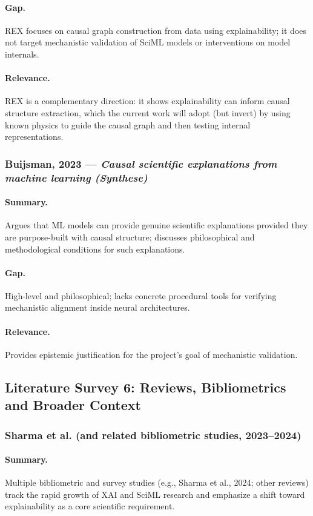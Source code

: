 \documentclass[12pt,singleside,a4paper]{article}
\begin{document}
\paragraph{Gap.}
REX focuses on causal graph construction from data using explainability; it does not target mechanistic validation of SciML models or interventions on model internals.  
\paragraph{Relevance.}
REX is a complementary direction: it shows explainability can inform causal structure extraction, which the current work will adopt (but invert) by using known physics to guide the causal graph and then testing internal representations. 

\subsubsection{Buijsman, 2023 — \textit{Causal scientific explanations from machine learning (Synthese)}}
\paragraph{Summary.}
Argues that ML models can provide genuine scientific explanations provided they are purpose-built with causal structure; discusses philosophical and methodological conditions for such explanations.  
\paragraph{Gap.}
High-level and philosophical; lacks concrete procedural tools for verifying mechanistic alignment inside neural architectures.  
\paragraph{Relevance.}
Provides epistemic justification for the project’s goal of mechanistic validation. 

\subsection{Literature Survey 6: Reviews, Bibliometrics and Broader Context}

\subsubsection{Sharma et al. (and related bibliometric studies, 2023--2024)}
\paragraph{Summary.}
Multiple bibliometric and survey studies (e.g., Sharma et al., 2024; other reviews) track the rapid growth of XAI and SciML research and emphasize a shift toward explainability as a core scientific requirement.  
\end{document}
